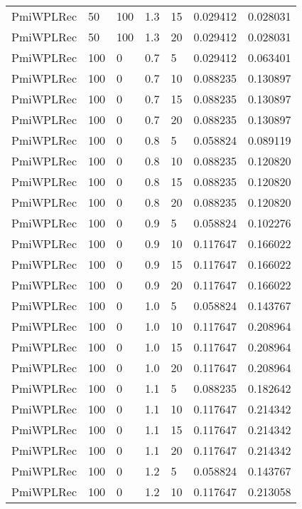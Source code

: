 \begin{tabular}{lllrlrr}
 PmiWPLRec &   50 &   100 &   1.3 &   15 &     0.029412 &  0.028031 \\
 PmiWPLRec &   50 &   100 &   1.3 &   20 &     0.029412 &  0.028031 \\
 PmiWPLRec &  100 &     0 &   0.7 &    5 &     0.029412 &  0.063401 \\
 PmiWPLRec &  100 &     0 &   0.7 &   10 &     0.088235 &  0.130897 \\
 PmiWPLRec &  100 &     0 &   0.7 &   15 &     0.088235 &  0.130897 \\
 PmiWPLRec &  100 &     0 &   0.7 &   20 &     0.088235 &  0.130897 \\
 PmiWPLRec &  100 &     0 &   0.8 &    5 &     0.058824 &  0.089119 \\
 PmiWPLRec &  100 &     0 &   0.8 &   10 &     0.088235 &  0.120820 \\
 PmiWPLRec &  100 &     0 &   0.8 &   15 &     0.088235 &  0.120820 \\
 PmiWPLRec &  100 &     0 &   0.8 &   20 &     0.088235 &  0.120820 \\
 PmiWPLRec &  100 &     0 &   0.9 &    5 &     0.058824 &  0.102276 \\
 PmiWPLRec &  100 &     0 &   0.9 &   10 &     0.117647 &  0.166022 \\
 PmiWPLRec &  100 &     0 &   0.9 &   15 &     0.117647 &  0.166022 \\
 PmiWPLRec &  100 &     0 &   0.9 &   20 &     0.117647 &  0.166022 \\
 PmiWPLRec &  100 &     0 &   1.0 &    5 &     0.058824 &  0.143767 \\
 PmiWPLRec &  100 &     0 &   1.0 &   10 &     0.117647 &  0.208964 \\
 PmiWPLRec &  100 &     0 &   1.0 &   15 &     0.117647 &  0.208964 \\
 PmiWPLRec &  100 &     0 &   1.0 &   20 &     0.117647 &  0.208964 \\
 PmiWPLRec &  100 &     0 &   1.1 &    5 &     0.088235 &  0.182642 \\
 PmiWPLRec &  100 &     0 &   1.1 &   10 &     0.117647 &  0.214342 \\
 PmiWPLRec &  100 &     0 &   1.1 &   15 &     0.117647 &  0.214342 \\
 PmiWPLRec &  100 &     0 &   1.1 &   20 &     0.117647 &  0.214342 \\
 PmiWPLRec &  100 &     0 &   1.2 &    5 &     0.058824 &  0.143767 \\
 PmiWPLRec &  100 &     0 &   1.2 &   10 &     0.117647 &  0.213058 \\

\end{tabular}
